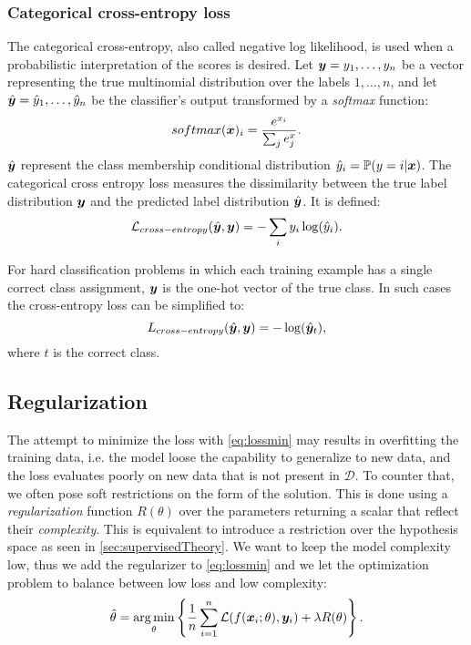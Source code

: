 \subsubsection{Categorical cross-entropy loss}
The categorical cross-entropy, also called negative log likelihood, is
used when a probabilistic interpretation of the scores is desired. Let
$\bm{y}=y_1,\dots,y_n$ be a vector representing the true multinomial
distribution over the labels $1,\dots,n$, and let
$\hat{\bm{y}}=\hat{y}_1,\dots,\hat{y}_n$ be the classifier's output
transformed by a \emph{softmax} function:
\begin{equation*}
  softmax(\bm{x})_i=\frac{e^{x_i}}{\sum_j e^x_j}.
\end{equation*}
$\hat{\bm{y}}$ represent the class membership conditional
distribution $\hat{y}_i=\mathbb{P}(y=i|\bm{x})$. The categorical cross
entropy loss measures the dissimilarity between the true label
distribution $\bm{y}$ and the predicted label distribution
$\hat{\bm{y}}$. It is defined:
\begin{equation*}
  \mathcal{L}_{cross-entropy}(\hat{\bm{y}},\bm{y})=-\sum_i y_i\log(\hat{y}_i).
\end{equation*}

For hard classification problems in which each training example has a
single correct class assignment, $\bm{y}$ is the one-hot vector of
the true class. In such cases the cross-entropy loss can be simplified
to:
\begin{equation*}
  L_{cross-entropy}(\hat{\bm{y}},\bm{y}) = -\log(\hat{\bm{y}}_t),
\end{equation*}
where $t$ is the correct class.

\subsection{Regularization}
The attempt to minimize the loss with \eqref{eq:lossmin} may results 
in overfitting the training data, i.e. the model loose the capability
to generalize to new data, and the loss evaluates poorly on new data
that is not present in $\mathcal{D}$. To counter that, we often pose
soft restrictions on the form of the solution. This is done using a
\emph{regularization}
function $R(\theta)$ over the parameters returning a scalar that
reflect their \emph{complexity}. This is equivalent to introduce a
restriction over the hypothesis space as seen in
\cref{sec:supervisedTheory}. We want to keep the model complexity low,
thus we add the regularizer to \eqref{eq:lossmin} and we let the
optimization problem to balance between low loss and low complexity:
\begin{equation}\label{eq:lossminReg}
  \hat\theta=\operatorname*{arg\,min}_\theta\left\{\frac{1}{n}\sum_{i=1}^n\mathcal{L}(f(\bm{x}_i;\theta),\bm{y}_i)+\lambda
    R(\theta)\right\}.
\end{equation}

